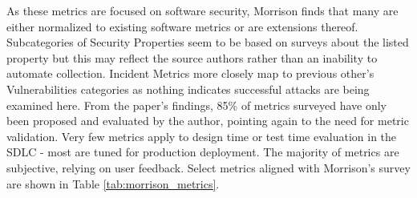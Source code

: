 
As these metrics are focused on software security, Morrison finds that many are either normalized to existing software metrics or are extensions thereof. Subcategories of Security Properties seem to be based on surveys about the listed property but this may reflect the source authors rather than an inability to automate collection. Incident Metrics more closely map to previous other’s Vulnerabilities categories as nothing indicates successful attacks are being examined here. 
From the paper’s findings, 85\% of metrics surveyed have only been proposed and evaluated by the author, pointing again to the need for metric validation. Very few metrics apply to design time or test time evaluation in the SDLC - most are tuned for production deployment. The majority of metrics are subjective, relying on user feedback. Select metrics aligned with Morrison's survey are shown in Table \ref{tab:morrison_metrics}.

